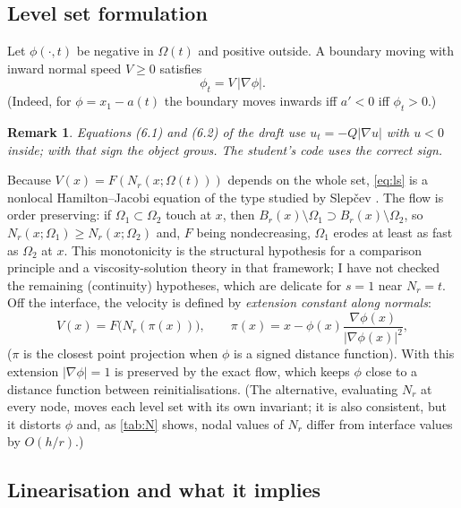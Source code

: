\documentclass[11pt]{article}
\newtheorem{remark}{Remark}
\newcommand{\N}{N_r}
\begin{document}
\subsection{Level set formulation}

Let $\phi(\cdot,t)$ be negative in $\Omega(t)$ and positive outside. A boundary moving with inward normal
speed $V\ge0$ satisfies
\begin{equation}\label{eq:ls}
\phi_t = V\,|\nabla\phi| .
\end{equation}
(Indeed, for $\phi=x_1-a(t)$ the boundary moves inwards iff $a'<0$ iff $\phi_t>0$.)
\begin{remark}
Equations (6.1) and (6.2) of the draft use $u_t=-Q|\nabla u|$ with $u<0$ inside; with that sign the
object grows. The student's code uses the correct sign.
\end{remark}
Because $V(x)=F(\N(x;\Omega(t)))$ depends on the whole set, \eqref{eq:ls} is a nonlocal
Hamilton--Jacobi equation of the type studied by Slep\v{c}ev \cite{slepcev03}. The flow is
order preserving: if $\Omega_1\subset\Omega_2$ touch at $x$, then $B_r(x)\setminus\Omega_1\supset
B_r(x)\setminus\Omega_2$, so $\N(x;\Omega_1)\ge\N(x;\Omega_2)$ and, $F$ being nondecreasing,
$\Omega_1$ erodes at least as fast as $\Omega_2$ at $x$. This monotonicity is the structural hypothesis
for a comparison principle and a viscosity-solution theory in that framework; I have not checked the
remaining (continuity) hypotheses, which are delicate for $s=1$ near $\N=t$.
Off the interface, the velocity is defined by \emph{extension constant along normals}:
\begin{equation}\label{eq:ext}
V(x)=F\big(\N(\pi(x))\big),\qquad \pi(x)=x-\phi(x)\frac{\nabla\phi(x)}{|\nabla\phi(x)|^2},
\end{equation}
($\pi$ is the closest point projection when $\phi$ is a signed distance function). With this extension
$|\nabla\phi|=1$ is preserved by the exact flow, which keeps $\phi$ close to a distance function between
reinitialisations. (The alternative, evaluating $\N$ at every node, moves each level set with its own
invariant; it is also consistent, but it distorts $\phi$ and, as \cref{tab:N} shows, nodal values of $\N$
differ from interface values by $O(h/r)$.)

\subsection{Linearisation and what it implies}\label{sec:linear}
\end{document}
